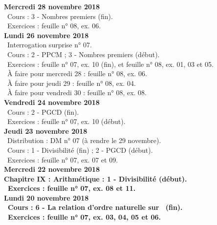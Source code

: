 \documentclass[12pt,a4paper]{article}
\begin{document}
\noindent\textbf{\bf Mercredi 28 novembre 2018}\\
\bu\ Cours : 3 - Nombres premiers (fin).\\
\bu\ Exercices : feuille n° 08, ex. 06.\vspace{.4cm}\\
 
\noindent\textbf{Lundi 26 novembre 2018}\\
\bu\ Interrogation surprise n° 07.\\
\bu\ Cours : 2 - PPCM ; 3 - Nombres premiers (début).\\
\bu\ Exercices : feuille n° 07, ex. 10 (fin), et feuille n° 08, ex. 01, 03 et 05.\\
\bu\ À faire pour mercredi 28 : feuille n° 08, ex. 06.\\
\bu\ À faire pour jeudi 29 : feuille n° 08, ex. 04.\\
\bu\ À faire pour vendredi 30 : feuille n° 08, ex. 08.\vspace{.4cm}\\
 
\noindent\textbf{Vendredi 24 novembre 2018}\\
\bu\ Cours : 2 - PGCD (fin).\\
\bu\ Exercices : feuille n° 07, ex. 10 (début).\vspace{.4cm}\\
 
\noindent\textbf{Jeudi 23 novembre 2018}\\
\bu\ Distribution : DM n° 07 (à rendre le 29 novembre).\\
\bu\ Cours : 1 - Divisibilité (fin) ; 2 - PGCD (début).\\
\bu\ Exercices : feuille n° 07, ex. 07 et 09.\vspace{.4cm}\\
 
\noindent\textbf{\bf Mercredi 22 novembre 2018}\\
\bf Chapitre IX \rm : Arithmétique : 1 - Divisibilité (début).\\
\bu\ Exercices : feuille n° 07, ex. 08 et 11.\vspace{.4cm}\\
 
\noindent\textbf{Lundi 20 novembre 2018}\\
\bu\ Cours : 6 - La relation d'ordre naturelle sur \R\ (fin).\\
\bu\ Exercices : feuille n° 07, ex. 03, 04, 05 et 06.\vspace{.4cm}\\
\end{document}
